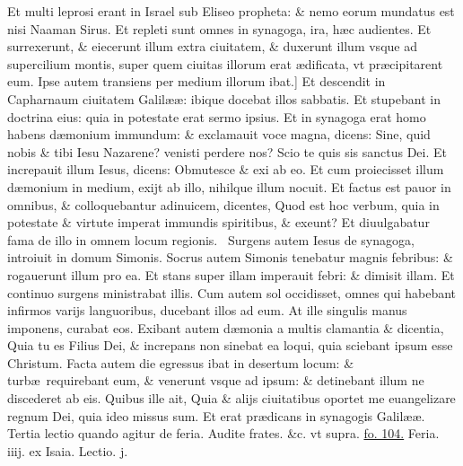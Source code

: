 \documentclass[a5paper,10pt]{book}
\def\leftmarginnote{%
	\lrmarginnote{\hskip -\marginparsep \hskip -6.5em}}
\def\ae{æ}
\begin{document}
\begin{multicols*}{2}
Et multi leprosi erant in Israel sub Eliseo propheta: \& nemo eorum mundatus est nisi Naaman Sirus. Et repleti sunt omnes in synagoga, ira, h\ae c audientes.
Et surrexerunt, \& eiecerunt illum extra ciuitatem, \& duxerunt illum vsque ad supercilium montis, super quem ciuitas illorum erat \ae dificata, vt pr\ae cipitarent eum.
Ipse autem transiens per medium illorum ibat.]
Et\leftmarginnote{\begin{flushright}D\end{flushright}} descendit in Capharnaum ciuitatem Galil\ae \ae : ibique docebat illos sabbatis.
Et stupebant in doctrina eius: quia in potestate erat sermo ipsius.
Et in synagoga erat homo habens d\ae monium immundum: \& exclamauit voce magna, dicens: Sine, quid nobis \& tibi Iesu Nazarene? venisti perdere nos? Scio te quis sis sanctus Dei.
Et increpauit illum Iesus, dicens: Obmutesce \& exi ab eo. Et cum proiecisset illum d\ae monium in medium, exijt ab illo, nihilque illum nocuit.
Et factus est pauor in omnibus, \& colloquebantur
adinuicem, dicentes, Quod est hoc verbum, quia in potestate \& virtute imperat immundis spiritibus, \& exeunt?
Et diuulgabatur fama de illo in omnem locum regionis. \textdagger \ 
Surgens\leftmarginnote{\begin{flushright}E\end{flushright}} autem Iesus de synagoga, introiuit in domum Simonis.
Socrus autem Simonis tenebatur magnis febribus: \& rogauerunt illum pro ea.
Et stans super illam imperauit febri: \& dimisit illam. Et continuo surgens ministrabat illis.
Cum autem sol occidisset, omnes qui habebant infirmos varijs languoribus, ducebant illos ad eum.
At ille singulis manus imponens, curabat eos.
Exibant autem d\ae monia a multis clamantia \& dicentia, Quia tu es Filius Dei, \& increpans non sinebat ea loqui, quia sciebant ipsum esse Christum. 
Facta autem die egressus ibat in desertum locum: \& turb\ae \ requirebant eum, \& venerunt vsque ad ipsum: \& detinebant illum ne discederet ab eis.
Quibus ille ait, Quia \& alijs ciuitatibus oportet me euangelizare regnum Dei, quia ideo missus sum.
Et erat pr\ae dicans in synagogis Galil\ae \ae .
\newline \color{red} Tertia lectio quando agitur de feria. \color{black} Audite frates. \&c. \color{red} vt supra. \color{black} \hyperlink{page.104}{fo. 104.}
\newline \textswab{C} \color{red} \hypertarget{WED-SECUNDA-ADV}{Feria. iiij.} ex Isaia. \hfill Lectio. j. \color{black}
\bookmark[dest=WED-SECUNDA-ADV]{FERIA QVARTA}
\vspace{-.25em}

\end{multicols*}
\end{document}
